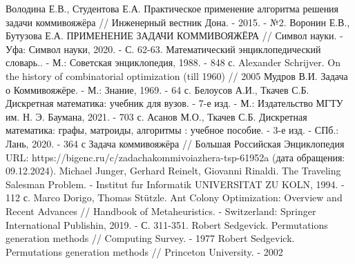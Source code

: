 \begin{thebibliography}{}
     Володина Е.В., Студентова Е.А. Практическое применение алгоритма решения задачи коммивояжёра // Инженерный вестник Дона. - 2015. - №2.
     Воронин Е.В., Бутузова Е.А. ПРИМЕНЕНИЕ ЗАДАЧИ КОММИВОЯЖЁРА // Символ науки. - Уфа: Символ науки, 2020. - С. 62-63.
     Математический энциклопедический словарь.. - М.: Советская энциклопедия, 1988. - 848 с.
     Alexander Schrijver. On the history of combinatorial optimization (till 1960) // 2005
     Мудров В.И. Задача о Коммивояжёре. - М.: Знание, 1969. - 64 с.
     Белоусов А.И., Ткачев С.Б. Дискретная математика: учебник для вузов. - 7-е изд. - М.: Издательство МГТУ им. Н. Э. Баумана, 2021. - 703 с.
     Асанов М.О., Ткачев С.Б. Дискретная математика: графы, матроиды, алгоритмы : учебное пособие. - 3-е изд. - СПб.: Лань, 2020. - 364 с
     Задача коммивояжёра // Большая Российская Энциклопедия URL: https://bigenc.ru/c/zadachakommivoiazhera-tsp-61952a (дата обращения: 09.12.2024).
     Michael Junger, Gerhard Reinelt, Giovanni Rinaldi. The Traveling Salesman Problem. - Institut fur Informatik UNIVERSITAT ZU KOLN, 1994. - 112 с.
     Marco Dorigo, Thomas Stützle. Ant Colony Optimization: Overview and Recent Advances // Handbook of Metaheuristics. - Switzerland: Springer International Publishin, 2019. - С. 311-351.
     Robert Sedgevick. Permutations generation methods // Computing Survey. - 1977
     Robert Sedgevick. Permutations generation methods // Princeton University. - 2002
\end{thebibliography}